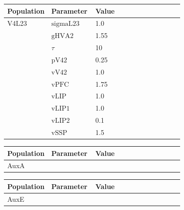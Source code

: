 \documentclass{article}
\begin{document}
\vspace{2ex}

\noindent
\begin{tabularx}{\linewidth}{|p{0.25\linewidth}|p{0.25\linewidth}|X|}\hline
\textbf{Population} & \textbf{Parameter} & \textbf{Value}   \\ \hline

    V4L23             & ${\text{sigmaL23}}$        & 1.0  \\ \hline

                 & ${\text{gHVA2}}$        & 1.55  \\ \hline

                 & $\tau$        & 10  \\ \hline

                 & ${\text{pV42}}$        & 0.25  \\ \hline

                 & ${\text{vV42}}$        & 1.0  \\ \hline

                 & ${\text{vPFC}}$        & 1.75  \\ \hline

                 & ${\text{vLIP}}$        & 1.0  \\ \hline

                 & ${\text{vLIP1}}$        & 1.0  \\ \hline

                 & ${\text{vLIP2}}$        & 0.1  \\ \hline

                 & ${\text{vSSP}}$        & 1.5  \\ \hline

\end{tabularx}

\vspace{2ex}

\noindent
\begin{tabularx}{\linewidth}{|p{0.25\linewidth}|p{0.25\linewidth}|X|}\hline
\textbf{Population} & \textbf{Parameter} & \textbf{Value}   \\ \hline

AuxA             &         &   \\ \hline

\end{tabularx}

\vspace{2ex}

\noindent
\begin{tabularx}{\linewidth}{|p{0.25\linewidth}|p{0.25\linewidth}|X|}\hline
\textbf{Population} & \textbf{Parameter} & \textbf{Value}   \\ \hline

AuxE             &         &   \\ \hline

\end{tabularx}
\end{document}
